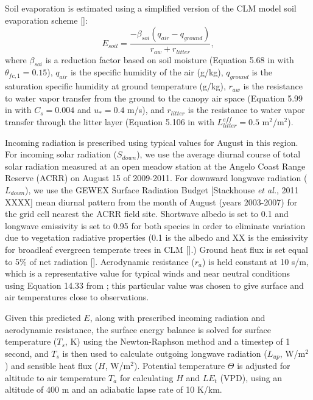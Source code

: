 Soil evaporation is estimated using a simplified version of the CLM model soil evaporation scheme [\cite{oleson2010technical}]:
\begin{equation}
E_{soil} = \frac{-\beta_{soi}(q_{air}-q_{ground})}{r_{aw}+r_{litter}},
\end{equation}
where $\beta_{soi}$ is a reduction factor based on soil moisture (Equation 5.68 in \cite{oleson2010technical} with $\theta_{fc,1}=0.15$), $q_{air}$ is the specific humidity of the air (g/kg), $q_{ground}$ is the saturation specific humidity at ground temperature (g/kg), $r_{aw}$ is the resistance to water vapor transfer from the ground to the canopy air space (Equation 5.99 in \cite{oleson2010technical} with $C_s=0.004$ and $u_*=0.4$ m/s), and $r_{litter}$ is the resistance to water vapor transfer through the litter layer (Equation 5.106 in \cite{oleson2010technical} with $L^{eff}_{litter}=0.5$ m$^2$/m$^2$).

Incoming radiation is prescribed using typical values for August in this region.  For incoming solar radiation ($S_{down}$), we use the average diurnal course of total solar radiation measured at an open meadow station at the Angelo Coast Range Reserve (ACRR) on August 15 of 2009-2011.  For downward longwave radiation ($L_{down}$), we use the GEWEX Surface Radiation Budget [Stackhouse \textit{et al.}, 2011 XXXX] mean diurnal pattern from the month of August (years 2003-2007) for the grid cell nearest the ACRR field site.  Shortwave albedo is set to 0.1 and longwave emissivity is set to 0.95 for both species in order to eliminate variation due to vegetation radiative properties (0.1 is the albedo and XX is the emissivity for broadleaf evergreen temperate trees in CLM [\cite{oleson2010technical}].)  Ground heat flux is set equal to 5\% of net radiation [\cite{ogee2001long}].  Aerodynamic resistance ($r_a$) is held constant at 10 s/m, which is a representative value for typical winds and near neutral conditions using Equation 14.33 from \cite{bonan}; this particular value was chosen to give surface and air temperatures close to observations.

Given this predicted $E$, along with prescribed incoming radiation and aerodynamic resistance, the surface energy balance is solved for surface temperature ($T_s$, K) using the Newton-Raphson method and a timestep of 1 second, and $T_s$ is then used to calculate outgoing longwave radiation ($L_{up}$, W/m$^2$) and sensible heat flux ($H$, W/m$^2$).  Potential temperature $\Theta$ is adjusted for altitude to air temperature $T_a$ for calculating $H$ and $LE_t$ (VPD), using an altitude of 400 m and an adiabatic lapse rate of 10 K/km.  

